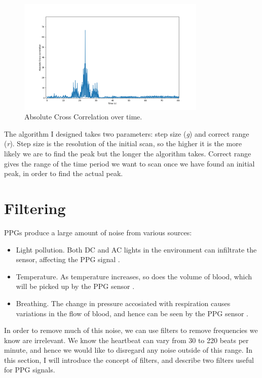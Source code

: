 \documentclass[12pt,a4paper,twoside,openright]{report}
\begin{document}
\begin{figure}[h!]
	\centerline{\includegraphics[width=0.8\textwidth]{figs/cross-correlation.png}}
	\caption{Absolute Cross Correlation over time. }
	\label{fig:cross-correlation}
\end{figure}

The algorithm I designed takes two parameters: step size (\emph{g}) and
correct range (\emph{r}). Step size is the resolution of the initial scan, so the
higher it is the more likely we are to find the peak but the longer the
algorithm takes. Correct range gives the range of the time period we want to
scan once we have found an initial peak, in order to find the actual peak.

\section{Filtering}

PPGs produce a large amount of noise from various sources:
\begin{itemize}
	\item Light pollution. Both DC and AC lights in the environment can
		infiltrate the sensor, affecting the PPG signal \cite{kim15}.
	\item Temperature. As temperature increases, so does the volume of
		blood, which will be picked up by the PPG sensor 
		\cite{shin16}.
	\item Breathing. The change in pressure accosiated with respiration
		causes variations in the flow of blood, and hence can be seen
		by the PPG sensor \cite{allen02}.
\end{itemize}

In order to remove much of this noise, we can use filters to remove
frequencies we know are irrelevant. We know the heartbeat can vary from 
30 to 220 beats per minute, and hence we would like to disregard any noise 
outside of this range. In this section, I will introduce the concept of 
filters, and describe two filters useful for PPG signals.
\end{document}
